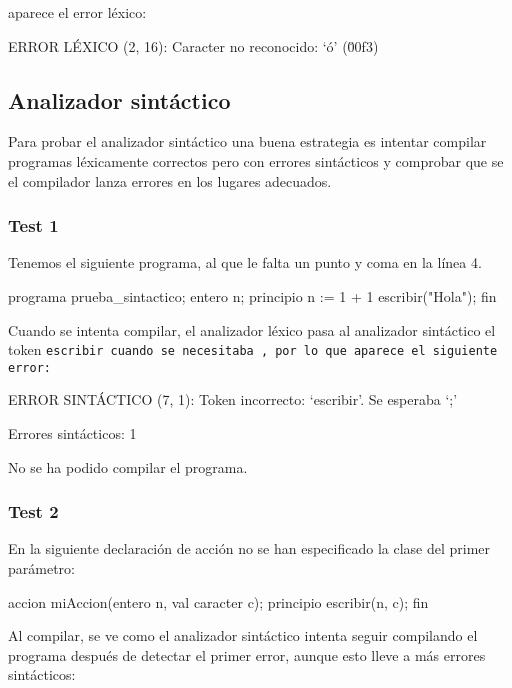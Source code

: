 aparece el error léxico:

\begin{codigo}
ERROR LÉXICO (2, 16): Caracter no reconocido: `ó' (\u00f3)
\end{codigo}

\subsection{Analizador sintáctico}
Para probar el analizador sintáctico una buena estrategia es intentar compilar programas léxicamente correctos pero con errores sintácticos y comprobar que se el compilador lanza errores en los lugares adecuados.

\subsubsection{Test 1}
Tenemos el siguiente programa, al que le falta un punto y coma en la línea 4.

\begin{codigo}[style=minileng,numbers=left]
programa prueba_sintactico;
entero n;
principio
    n := 1 + 1
    escribir("Hola");
fin
\end{codigo}

Cuando se intenta compilar, el analizador léxico pasa al analizador sintáctico el token \tt{escribir} cuando se necesitaba \car{;}, por lo que aparece el siguiente error:

\begin{codigo}
ERROR SINTÁCTICO (7, 1): Token incorrecto: `escribir'. Se esperaba `;'

Errores sintácticos: 1

No se ha podido compilar el programa.
\end{codigo}

\subsubsection{Test 2}
En la siguiente declaración de acción no se han especificado la clase del primer parámetro:

\begin{codigo}[style=minileng,numbers=left,firstnumber=4]
accion miAccion(entero n, val caracter c);
principio
    escribir(n, c);
fin
\end{codigo}

Al compilar, se ve como el analizador sintáctico intenta seguir compilando el programa después de detectar el primer error, aunque esto lleve a más errores sintácticos:

